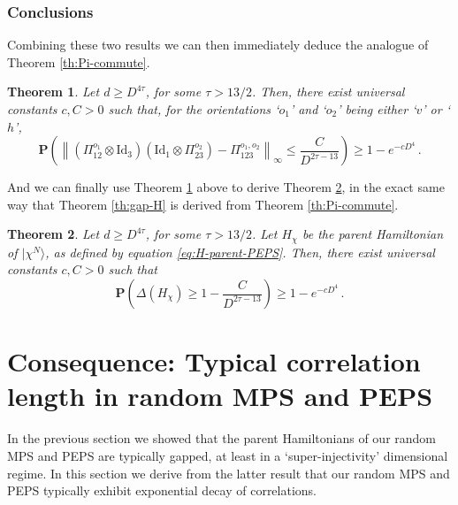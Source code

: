 \documentclass{amsart}
\newtheorem{theorem}{Theorem}[section]
\renewcommand{\P}{\mathbf{P}}
\renewcommand{\leq}{\leqslant}
\renewcommand{\geq}{\geqslant}
\newcommand{\Id}{\mathrm{Id}}
\newcommand{\ket}[1]{| #1 \rangle}
\begin{document}
\subsubsection{Conclusions} \hfill\par\smallskip

Combining these two results we can then immediately deduce the analogue of Theorem \ref{th:Pi-commute}.

\begin{theorem} \label{th:Pi-commute-PEPS}
    Let $d\geq D^{4\tau}$, for some $\tau>13/2$. Then, there exist universal constants $c,C>0$ such that, for the orientations `$o_1$' and `$o_2$' being either `$v$' or `$h$',
    \[ \P\left( \left\| \left(\Pi_{12}^{o_1}\otimes\Id_3\right) \left(\Id_1\otimes\Pi_{23}^{o_2}\right) - \Pi^{o_1,o_2}_{123} \right\|_{\infty} \leq \frac{C}{D^{2\tau-13}} \right) \geq 1-e^{-cD^4} \, . \]
\end{theorem}

And we can finally use Theorem \ref{th:Pi-commute-PEPS} above to derive Theorem \ref{th:gap-H-PEPS}, in the exact same way that Theorem \ref{th:gap-H} is derived from Theorem \ref{th:Pi-commute}.

\begin{theorem} \label{th:gap-H-PEPS}
    Let $d\geq D^{4\tau}$, for some $\tau>13/2$. Let $H_{\chi}$ be the parent Hamiltonian of $\ket{\chi^N}$, as defined by equation \eqref{eq:H-parent-PEPS}. Then, there exist universal constants $c,C>0$ such that
    \[ \P\left( \Delta(H_{\chi}) \geq 1-\frac{C}{D^{2\tau-13}} \right) \geq 1-e^{-cD^4} \, . \]
\end{theorem}


\section{Consequence: Typical correlation length in random MPS and PEPS}
\label{sec:decay-correlations-1}

In the previous section we showed that the parent Hamiltonians of our random MPS and PEPS are typically gapped, at least in a `super-injectivity' dimensional regime. In this section we derive from the latter result that our random MPS and PEPS typically exhibit exponential decay of correlations.
\end{document}

